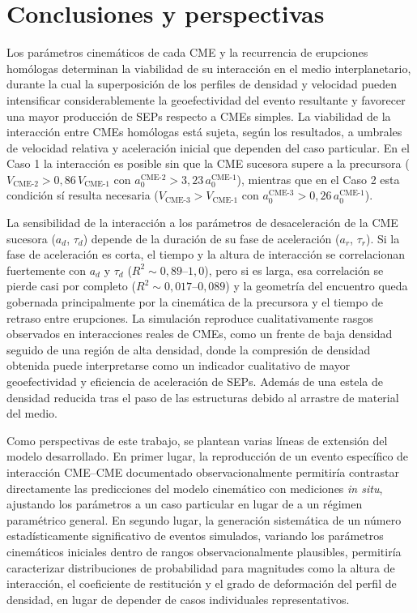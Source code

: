 \chapter{Conclusiones y perspectivas}
\label{conclusiones}
Los parámetros cinemáticos de cada CME y la recurrencia de erupciones homólogas determinan la viabilidad de su interacción en el medio interplanetario, durante la cual la superposición de los perfiles de densidad y velocidad pueden intensificar considerablemente la geoefectividad del evento resultante y favorecer una mayor producción de SEPs respecto a CMEs simples. La viabilidad de la interacción entre CMEs homólogas está sujeta, según los resultados, a umbrales de velocidad relativa y aceleración inicial que dependen del caso particular. En el Caso 1 la interacción es posible sin que la CME sucesora supere a la precursora ($V_{\text{CME-2}}>0{,}86\,V_{\text{CME-1}}$ con $a_0^{\text{CME-2}}>3{,}23\,a_0^{\text{CME-1}}$), mientras que en el Caso 2 esta condición sí resulta necesaria ($V_{\text{CME-3}}>V_{\text{CME-1}}$ con $a_0^{\text{CME-3}}>0{,}26\,a_0^{\text{CME-1}}$). 

La sensibilidad de la interacción a los parámetros de desaceleración de la CME sucesora ($a_d$, $\tau_d$) depende de la duración de su fase de aceleración ($a_r$, $\tau_r$). Si la fase de aceleración es corta, el tiempo y la altura de interacción se correlacionan fuertemente con $a_d$ y $\tau_d$ ($R^2 \sim 0{,}89$–$1{,}0$), pero si es larga, esa correlación se pierde casi por completo ($R^2 \sim 0{,}017$–$0{,}089$) y la geometría del encuentro queda gobernada principalmente por la cinemática de la precursora y el tiempo de retraso entre erupciones. La simulación reproduce cualitativamente rasgos observados en interacciones reales de CMEs, como un frente de baja densidad seguido de una región de alta densidad, donde la compresión de densidad obtenida puede interpretarse como un indicador cualitativo de mayor geoefectividad y eficiencia de aceleración de SEPs. Además de una estela de densidad reducida tras el paso de las estructuras debido al arrastre de material del medio.

Como perspectivas de este trabajo, se plantean varias líneas de extensión del modelo desarrollado. En primer lugar, la reproducción de un evento específico de interacción CME--CME documentado observacionalmente permitiría contrastar directamente las predicciones del modelo cinemático con mediciones \textit{in situ}, ajustando los parámetros a un caso particular en lugar de a un régimen paramétrico general. En segundo lugar, la generación sistemática de un número estadísticamente significativo de eventos simulados, variando los parámetros cinemáticos iniciales dentro de rangos observacionalmente plausibles, permitiría caracterizar distribuciones de probabilidad para magnitudes como la altura de interacción, el coeficiente de restitución y el grado de deformación del perfil de densidad, en lugar de depender de casos individuales representativos. 

